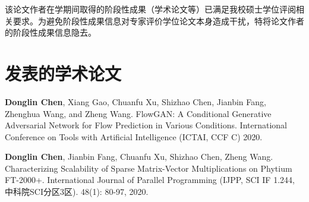 \begin{resume}
\ifreview
该论文作者在学期间取得的阶段性成果（学术论文等）已满足我校硕士学位评阅相关要求。为避免阶段性成果信息对专家评价学位论文本身造成干扰，特将论文作者的阶段性成果信息隐去。
\else

\ifisresumebib

	\begin{refsection}
	\setcounter{gbnamefmtcase}{1}%
	\nocite{ref-1-1-Yang,ref-2-1-杨轶,ref-3-1-杨轶,ref-4-1-Yang,ref-5-1-Wu,ref-6-1-贾泽,ref-7-1-伍晓明}
	
	\setlength{\biblabelsep}{12pt}
	\printbibliography[env=resumebib,heading=subbibliography,title={发表的学术论文}] %

	\end{refsection}


	\begin{refsection}
	\setcounter{gbnamefmtcase}{1}%
	\nocite{ref-8-1-任天令,ref-9-1-Ren}
	
	\setlength{\biblabelsep}{12pt}
	\printbibliography[env=resumebib,heading=subbibliography,title={研究成果}]

	\end{refsection}

\else

  \section*{发表的学术论文} %

  \begin{enumerate}[label={[\arabic*]}]
  \addtolength{\itemsep}{-.36\baselineskip}%
  \item \textbf{Donglin Chen}, Xiang Gao, Chuanfu Xu, Shizhao Chen, Jianbin Fang, Zhenghua Wang, and Zheng Wang. 
  FlowGAN: A Conditional Generative Adversarial Network for Flow Prediction in Various Conditions. 
  International Conference on Tools with Artificial Intelligence (ICTAI, CCF C) 2020.

  \item \textbf{Donglin Chen}, Jianbin Fang, Chuanfu Xu, Shizhao Chen, Zheng Wang. 
  Characterizing Scalability of Sparse Matrix-Vector Multiplications on Phytium FT-2000+. 
  International Journal of Parallel Programming (IJPP, SCI IF 1.244, 中科院SCI分区3区). 48(1): 80-97, 2020.
  

\end{enumerate}
\end{resume}
